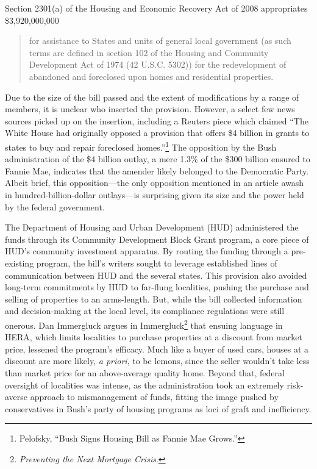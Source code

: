 \documentclass[
]{article}
\let\rmarkdownfootnote\footnote%
\def\footnote{\protect\rmarkdownfootnote}
\begin{document}
Section 2301(a) of the Housing and Economic Recovery Act of 2008
appropriates \$3,920,000,000

\begin{quote}
for assistance to States and units of general local government (as such
terms are defined in section 102 of the Housing and Community
Development Act of 1974 (42 U.S.C. 5302)) for the redevelopment of
abandoned and foreclosed upon homes and residential properties.
\end{quote}

Due to the size of the bill passed and the extent of modifications by a
range of members, it is unclear who inserted the provision. However, a
select few news sources picked up on the insertion, including a Reuters
piece which claimed ``The White House had originally opposed a provision
that offers \$4 billion in grants to states to buy and repair foreclosed
homes.''\footnote{Pelofsky, ``Bush Signs Housing Bill as Fannie Mae
  Grows.''} The opposition by the Bush administration of the \$4 billion
outlay, a mere 1.3\% of the \$300 billion ensured to Fannie Mae,
indicates that the amender likely belonged to the Democratic Party.
Albeit brief, this opposition---the only opposition mentioned in an
article awash in hundred-billion-dollar outlays---is surprising given
its size and the power held by the federal government.

The Department of Housing and Urban Development (HUD) administered the
funds through its Community Development Block Grant program, a core
piece of HUD's community investment apparatus. By routing the funding
through a pre-existing program, the bill's writers sought to leverage
established lines of communication between HUD and the several states.
This provision also avoided long-term commitments by HUD to far-flung
localities, pushing the purchase and selling of properties to an
arms-length. But, while the bill collected information and
decision-making at the local level, its compliance regulations were
still onerous. Dan Immergluck argues in Immergluck\footnote{\emph{Preventing
  the Next Mortgage Crisis}.} that ensuing language in HERA, which
limits localities to purchase properties at a discount from market
price, lessened the program's efficacy. Much like a buyer of used cars,
houses at a discount are more likely, \emph{a priori}, to be lemons,
since the seller wouldn't take less than market price for an
above-average quality home. Beyond that, federal oversight of localities
was intense, as the administration took an extremely risk-averse
approach to mismanagement of funds, fitting the image pushed by
conservatives in Bush's party of housing programs as loci of graft and
inefficiency.
\end{document}
